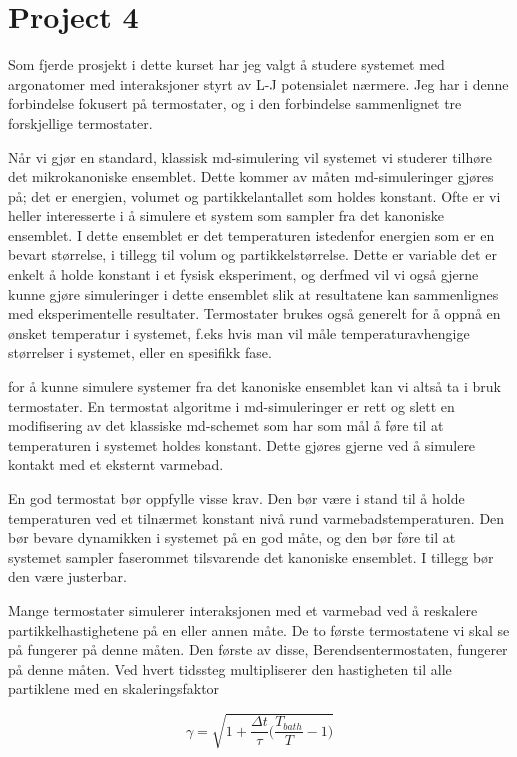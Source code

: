 \documentclass[a4paper,10pt]{article}
\begin{document}
\section*{Project 4}

Som fjerde prosjekt i dette kurset har jeg valgt å studere systemet med argonatomer med interaksjoner styrt av L-J potensialet nærmere. Jeg har i denne forbindelse fokusert på termostater, og i den forbindelse sammenlignet tre forskjellige termostater.

Når vi gjør en standard, klassisk md-simulering vil systemet vi studerer tilhøre det mikrokanoniske ensemblet. Dette kommer av måten md-simuleringer gjøres på; det er energien, volumet og partikkelantallet som holdes konstant. Ofte er vi heller interesserte i å simulere et system som sampler fra det kanoniske ensemblet. I dette ensemblet er det temperaturen istedenfor energien som er en bevart størrelse, i tillegg til volum og partikkelstørrelse. Dette er variable det er enkelt å holde konstant i et fysisk eksperiment, og derfmed vil vi også gjerne kunne gjøre simuleringer i dette ensemblet slik at resultatene kan sammenlignes med eksperimentelle resultater. Termostater brukes også generelt for å oppnå en ønsket temperatur i systemet, f.eks hvis man vil måle temperaturavhengige størrelser i systemet, eller en spesifikk fase.

for å kunne simulere systemer fra det kanoniske ensemblet kan vi altså ta i bruk termostater. En termostat algoritme i md-simuleringer er rett og slett en modifisering av det klassiske md-schemet som har som mål å føre til at temperaturen i systemet holdes konstant. Dette gjøres gjerne ved å simulere kontakt med et eksternt varmebad. 

En god termostat bør oppfylle visse krav. Den bør være i stand til å holde temperaturen ved et tilnærmet konstant nivå rund varmebadstemperaturen. Den bør bevare dynamikken i systemet på en god måte, og den bør føre til at systemet sampler faserommet tilsvarende det kanoniske ensemblet. I tillegg bør den være justerbar.

Mange termostater simulerer interaksjonen med et varmebad ved å reskalere partikkelhastighetene på en eller annen måte. De to første termostatene vi skal se på fungerer på denne måten. Den første av disse, Berendsentermostaten, fungerer på denne måten. Ved hvert tidssteg multipliserer den hastigheten til alle partiklene med en skaleringsfaktor

\begin{equation}
 \gamma = \sqrt{1+\frac{\Delta t}{\tau}\bigg(\frac{T_{bath}}{T}-1\bigg)}
\end{equation}
\end{document}
